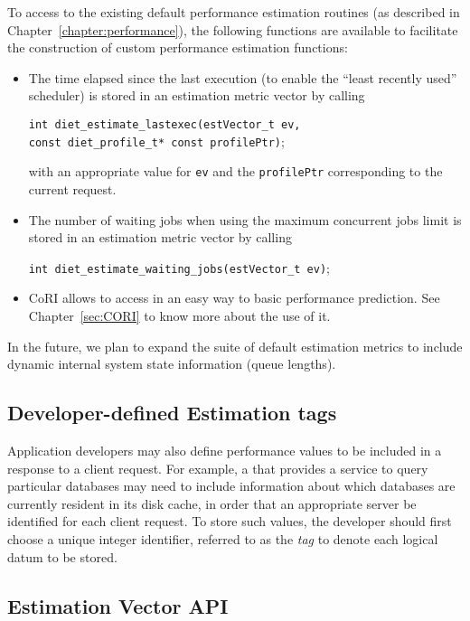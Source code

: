 To access to the existing default performance estimation routines (as described
in Chapter~\ref{chapter:performance}), the following functions are available to
facilitate the construction of custom performance estimation functions:
\begin{itemize}
\item The time elapsed since the last execution (to enable the ``least recently used''
  scheduler) is stored in an estimation metric vector by calling
  \begin{tabbing}
    \texttt{int diet\_estimate\_lastexec(}\=\texttt{estVector\_t ev,} \\
    \> \texttt{const diet\_profile\_t* const profilePtr)};
  \end{tabbing}
  with an appropriate value for \texttt{ev} and the \texttt{profilePtr}
  corresponding to the current \diet request.
\item The number of waiting jobs when using the maximum concurrent jobs limit
  is stored in an estimation metric vector by calling
  \begin{tabbing}
    \texttt{int diet\_estimate\_waiting\_jobs(}\=\texttt{estVector\_t ev)};
  \end{tabbing}
\item CoRI allows to access in an easy way to basic performance
  prediction. See Chapter~\ref{sec:CORI} to know more about the use of it.
\end{itemize}

In the future, we plan to expand the suite of default estimation metrics to
include dynamic internal \diet system state information (\eg queue lengths).

\subsection{Developer-defined Estimation tags}

Application developers may also define performance values to be included in a
\sed response to a client request.  For example, a \diet \sed that provides a
service to query particular databases may need to include information about
which databases are currently resident in its disk cache, in order that an
appropriate server be identified for each client request.  To store such
values, the \sed developer should first choose a unique integer identifier,
referred to as the \emph{tag} to denote each logical datum to be stored.

\subsection{Estimation Vector API}
\label{section:est_vect_api}

